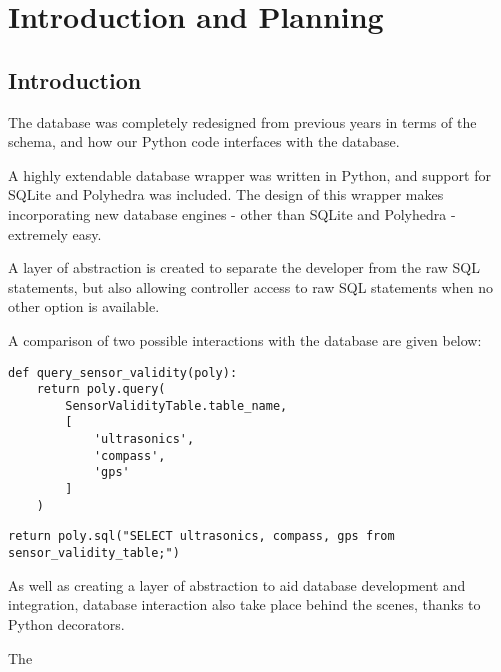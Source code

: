 \section{Introduction and Planning}

\subsection{Introduction}
The database was completely redesigned from previous years in terms of the schema, and how our Python code interfaces with the database.

A highly extendable database wrapper was written in Python, and support for SQLite and Polyhedra was included. The design of this wrapper makes incorporating new database engines - other than SQLite and Polyhedra - extremely easy.

A layer of abstraction is created to separate the developer from the raw SQL statements, but also allowing controller access to raw SQL statements when no other option is available.

A comparison of two possible interactions with the database are given below:

\begin{lstlisting}
def query_sensor_validity(poly):
    return poly.query(
        SensorValidityTable.table_name,
        [
            'ultrasonics',
            'compass',
            'gps'
        ]
    )
\end{lstlisting}

\begin{lstlisting}
return poly.sql("SELECT ultrasonics, compass, gps from sensor_validity_table;")
\end{lstlisting}

As well as creating a layer of abstraction to aid database development and integration, database interaction also take place behind the scenes, thanks to Python decorators.

The 

